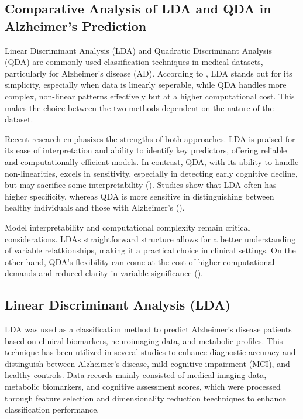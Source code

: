 \documentclass[12pt]{article}
\begin{document}
\subsection{Comparative Analysis of LDA and QDA in Alzheimer's Prediction}
\noindent

Linear Discriminant Analysis (LDA) and Quadratic Discriminant Analysis (QDA) are commonly used classification techniques in medical datasets, particularly for Alzheimer's disease (AD). According to \cite{jain2022}, LDA stands out for its simplicity, especially when data is linearly seperable, while QDA
handles more complex, non-linear patterns effectively but at a higher computational cost. This makes the choice between the two methods dependent on the nature of the dataset.

Recent research emphasizes the strengths of both approaches. LDA is praised for its ease of interpretation and ability to identify key predictors, offering reliable and computationally efficient models. In contrast, QDA, with its ability to handle non-linearities, excels in sensitivity, especially in
detecting early cognitive decline, but may sacrifice some interpretability (\cite{arbabshirani2017}). Studies show that LDA often has higher specificity, whereas QDA is more sensitive in distinguishing between healthy individuals and those with Alzheimer's (\cite{nguyen2020}).

Model interpretability and computational complexity remain critical considerations. LDAs straightforward structure allows for a better understanding of variable relatkionships, making it a practical choice in clinical settings. On the other hand, QDA's flexibility can come at the cost of higher
computational demands and reduced clarity in variable significance (\cite{wang2018}).

\subsection{Linear Discriminant Analysis (LDA)}
\noindent
LDA was used as a classification method to predict Alzheimer's disease patients based on clinical biomarkers, neuroimaging data, and metabolic profiles. This technique has been utilized in several studies to enhance diagnostic accuracy and distinguish between Alzheimer's disease, mild cognitive impairment
(MCI), and healthy controls. Data records mainly consisted of medical imaging data, metabolic biomarkers, and cognitive assessment scores, which were processed through feature selection and dimensionality reduction teechniques to enhance classification performance.
\end{document}
